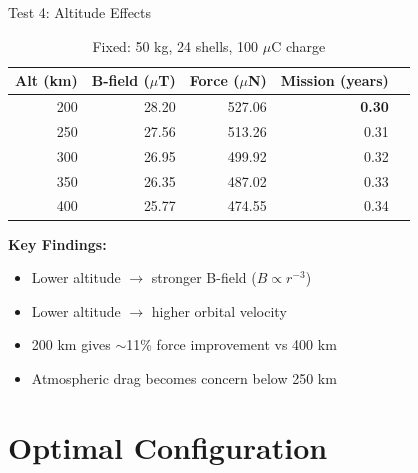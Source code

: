 \documentclass[11pt]{beamer}
\begin{document}
\begin{frame}{Test 4: Altitude Effects}

\begin{table}[h]
\centering
\begin{tabular}{rrrrr}
\toprule
\textbf{Alt (km)} & \textbf{B-field ($\mu$T)} & \textbf{Force ($\mu$N)} & \textbf{Mission (years)} \\
\midrule
\rowcolor{green!20}
200 & 28.20 & 527.06 & \textbf{0.30} \\
250 & 27.56 & 513.26 & 0.31 \\
300 & 26.95 & 499.92 & 0.32 \\
350 & 26.35 & 487.02 & 0.33 \\
400 & 25.77 & 474.55 & 0.34 \\
\bottomrule
\end{tabular}
\caption{Fixed: 50 kg, 24 shells, 100 $\mu$C charge}
\end{table}

\vspace{0.3cm}

\textbf{Key Findings:}
\begin{itemize}
\item Lower altitude $\rightarrow$ stronger B-field ($B \propto r^{-3}$)
\item Lower altitude $\rightarrow$ higher orbital velocity
\item 200 km gives $\sim$11\% force improvement vs 400 km
\item Atmospheric drag becomes concern below 250 km
\end{itemize}

\end{frame}

\section{Optimal Configuration}
\end{document}
